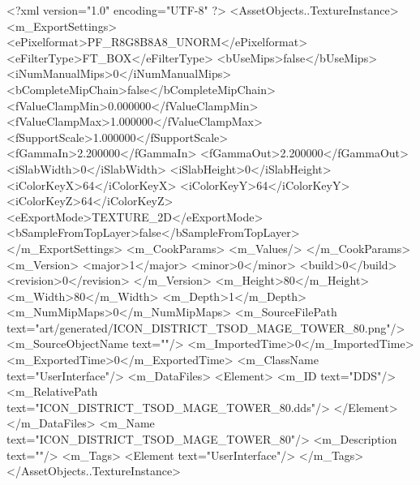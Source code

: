 <?xml version="1.0" encoding="UTF-8" ?>
<AssetObjects..TextureInstance>
	<m_ExportSettings>
		<ePixelformat>PF_R8G8B8A8_UNORM</ePixelformat>
		<eFilterType>FT_BOX</eFilterType>
		<bUseMips>false</bUseMips>
		<iNumManualMips>0</iNumManualMips>
		<bCompleteMipChain>false</bCompleteMipChain>
		<fValueClampMin>0.000000</fValueClampMin>
		<fValueClampMax>1.000000</fValueClampMax>
		<fSupportScale>1.000000</fSupportScale>
		<fGammaIn>2.200000</fGammaIn>
		<fGammaOut>2.200000</fGammaOut>
		<iSlabWidth>0</iSlabWidth>
		<iSlabHeight>0</iSlabHeight>
		<iColorKeyX>64</iColorKeyX>
		<iColorKeyY>64</iColorKeyY>
		<iColorKeyZ>64</iColorKeyZ>
		<eExportMode>TEXTURE_2D</eExportMode>
		<bSampleFromTopLayer>false</bSampleFromTopLayer>
	</m_ExportSettings>
	<m_CookParams>
		<m_Values/>
	</m_CookParams>
	<m_Version>
		<major>1</major>
		<minor>0</minor>
		<build>0</build>
		<revision>0</revision>
	</m_Version>
	<m_Height>80</m_Height>
	<m_Width>80</m_Width>
	<m_Depth>1</m_Depth>
	<m_NumMipMaps>0</m_NumMipMaps>
	<m_SourceFilePath text="art/generated/ICON_DISTRICT_TSOD_MAGE_TOWER_80.png"/>
	<m_SourceObjectName text=""/>
	<m_ImportedTime>0</m_ImportedTime>
	<m_ExportedTime>0</m_ExportedTime>
	<m_ClassName text="UserInterface"/>
	<m_DataFiles>
		<Element>
			<m_ID text="DDS"/>
			<m_RelativePath text="ICON_DISTRICT_TSOD_MAGE_TOWER_80.dds"/>
		</Element>
	</m_DataFiles>
	<m_Name text="ICON_DISTRICT_TSOD_MAGE_TOWER_80"/>
	<m_Description text=""/>
	<m_Tags>
		<Element text="UserInterface"/>
	</m_Tags>
</AssetObjects..TextureInstance>

